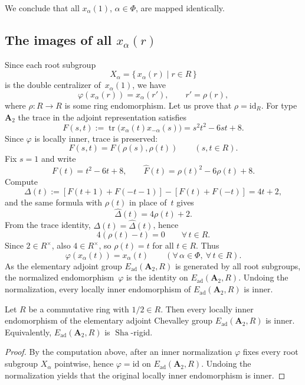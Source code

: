 \documentclass[]{jgcc}
\DeclareMathOperator{\tr}{tr}
\numberwithin{equation}{section}
\newcommand{\Sha}{\operatorname{Sha}}
\begin{document}
We conclude that all $x_\alpha(1)$, $\alpha\in\Phi$, are mapped identically.

\subsection{\texorpdfstring{The images of all $x_\alpha(r)$}{The images of all xalpha(r)}}\label{subsec:images-xalpha}

Since each root subgroup
\[
X_\alpha=\{\,x_\alpha(r)\mid r\in R\,\}
\]
is the double centralizer of~$x_\alpha(1)$, we have
\[
\varphi(x_\alpha(r))=x_\alpha(r'),\qquad r'=\rho(r),
\]
where $\rho\colon R\to R$ is some ring endomorphism.
Let us prove that $\rho=\mathrm{id}_R$.
For type~$\mathbf A_2$ the trace in the adjoint representation satisfies
\[
F(s,t):=\tr\!\bigl(x_\alpha(t)x_{-\alpha}(s)\bigr)
=s^2t^2-6st+8.
\]
Since $\varphi$ is locally inner, trace is preserved:
\[
F(s,t)=F(\rho(s),\rho(t))\qquad(s,t\in R).
\]
Fix $s=1$ and write
\[
F(t)=t^2-6t+8,\qquad
\widehat F(t)=\rho(t)^2-6\rho(t)+8.
\]
Compute
\[
\Delta(t):=[F(t{+}1)+F(-t{-}1)]-[F(t)+F(-t)]=4t+2,
\]
and the same formula with $\rho(t)$ in place of~$t$ gives
\[
\widehat\Delta(t)=4\rho(t)+2.
\]
From the trace identity, $\Delta(t)=\widehat\Delta(t)$, hence
\[
4(\rho(t)-t)=0\qquad\forall\,t\in R.
\]
Since $2\in R^\times$, also $4\in R^\times$, so $\rho(t)=t$ for all $t\in R$.
Thus
\[
\varphi(x_\alpha(t))=x_\alpha(t)\qquad
(\forall\,\alpha\in\Phi,\ \forall\,t\in R).
\]
As the elementary adjoint group $E_{\mathrm{ad}}(\mathbf A_2,R)$
is generated by all root subgroups, the normalized endomorphism~$\varphi$ is the identity on $E_{\mathrm{ad}}(\mathbf A_2,R)$.
Undoing the normalization, every locally inner endomorphism of
$E_{\mathrm{ad}}(\mathbf A_2,R)$ is inner.

\begin{thm}\label{thm:Sha-elementary-A2}
Let $R$ be a commutative ring with $1/2\in R$.
Then every locally inner endomorphism of the elementary adjoint Chevalley group
$E_{\mathrm{ad}}(\mathbf A_2,R)$ is inner. Equivalently, $E_{\mathrm{ad}}(\mathbf A_2,R)$ is $\Sha$-rigid.
\end{thm}

\begin{proof}
By the computation above, after an inner normalization $\varphi$ fixes every root subgroup $X_\alpha$ pointwise, hence $\varphi=\mathrm{id}$ on $E_{\mathrm{ad}}(\mathbf A_2,R)$.
Undoing the normalization yields that the original locally inner endomorphism is inner.
\end{proof}
\end{document}
